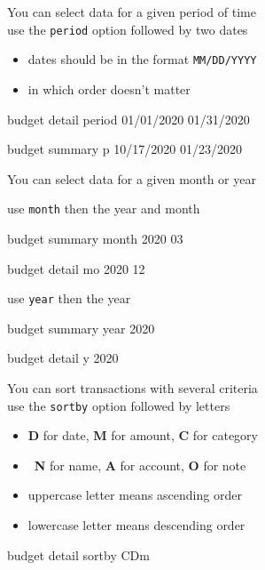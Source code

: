 \documentclass[12pt,letterpaper]{article}
\begin{document}
\begin{framed}
    \begin{minipage}[t][3in][t]{5in}
        \Large
        You can select data for a given period of time\\

        use the \lstinline[language=budget,basicstyle=\Large]!period! option followed by two dates
        \begin{itemize}
            \item dates should be in the format \texttt{MM/DD/YYYY}
            \item in which order doesn't matter
        \end{itemize}
        \begin{budget}
            budget detail period 01/01/2020 01/31/2020

            budget summary p 10/17/2020 01/23/2020 
        \end{budget}
    \end{minipage}
\end{framed}
\begin{framed}
    \begin{minipage}[t][3in][t]{5in}
        \Large
        You can select data for a given month or year

        use \lstinline[language=budget,basicstyle=\large]!month! then the year and month\\
        \begin{budget}
            budget summary month 2020 03

            budget detail mo 2020 12
        \end{budget}
        use  \lstinline[language=budget,basicstyle=\large]!year! then the year\\
        \begin{budget}
            budget summary year 2020

            budget detail y 2020
        \end{budget}
    \end{minipage}
\end{framed}
\begin{framed}
    \begin{minipage}[t][3in][t]{5in}
        \Large
        You can sort transactions with several criteria\\

        use the \lstinline[language=budget,basicstyle=\Large]!sortby! option followed by letters
        \begin{itemize}
            \item \textbf{D} for date, \textbf{M} for amount, \textbf{C} for category
            \item \textbf{N} for name, \textbf{A} for account, \textbf{O} for note
            \item uppercase letter means ascending order
            \item lowercase letter means descending order
        \end{itemize}
        \begin{budget}
            budget detail sortby CDm
        \end{budget}
    \end{minipage}
\end{framed}
\end{document}

